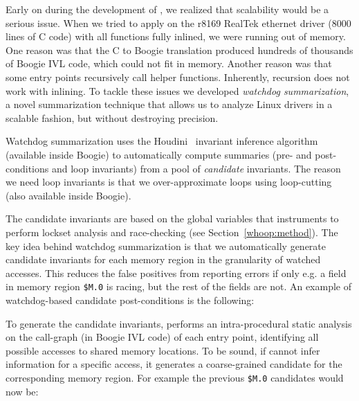 {Early on during the development of \whoop, we realized that scalability would be a serious issue. When we tried to apply \whoop on the r8169 RealTek ethernet driver (8000 lines of C code) with all functions fully inlined, we were running out of memory. One reason was that the C to Boogie translation produced hundreds of thousands of Boogie IVL code, which could not fit in memory. Another reason was that some entry points recursively call helper functions. Inherently, recursion does not work with inlining. To tackle these issues we developed \emph{watchdog summarization}, a novel summarization technique that allows us to analyze Linux drivers in a scalable fashion, but without destroying precision.

Watchdog summarization uses the Houdini~\cite{flanagan2001houdini} invariant inference algorithm (available inside Boogie) to automatically compute summaries (pre- and post-conditions and loop invariants) from a pool of \emph{candidate} invariants. The reason we need loop invariants is that we over-approximate loops using loop-cutting (also available inside Boogie).

The candidate invariants are based on the global variables that \whoop instruments to perform lockset analysis and race-checking (see Section~\ref{whoop:method}). The key idea behind watchdog summarization is that we automatically generate candidate invariants for each memory region in the granularity of watched accesses. This reduces the false positives from reporting errors if only e.g. a field in memory region \texttt{\$M.0} is racing, but the rest of the fields are not. An example of watchdog-based candidate post-conditions is the following:


To generate the candidate invariants, \whoop performs an intra-procedural static analysis on the call-graph (in Boogie IVL code) of each entry point, identifying all possible accesses to shared memory locations. To be sound, if \whoop cannot infer information for a specific access, it generates a coarse-grained candidate for the corresponding memory region. For example the previous \texttt{\$M.0} candidates would now be:

}
